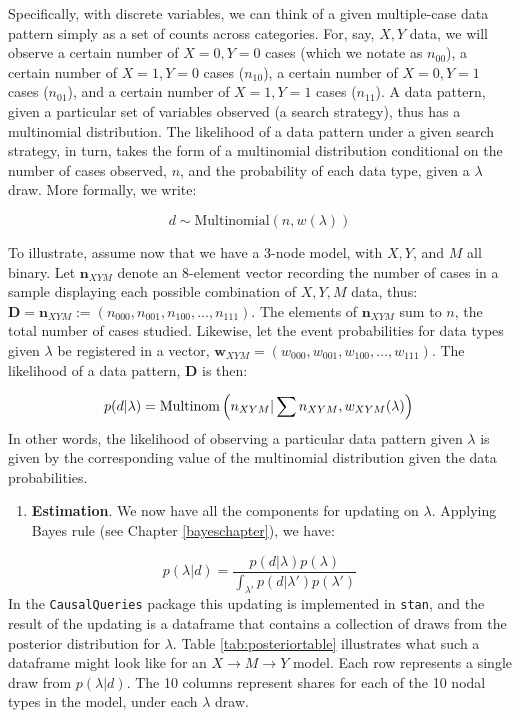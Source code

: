 \documentclass[
  12pt,
]{book}
\providecommand{\tightlist}{%
  \setlength{\itemsep}{0pt}\setlength{\parskip}{0pt}}
\begin{document}
Specifically, with discrete variables, we can think of a given multiple-case data pattern simply as a set of counts across categories. For, say, \(X, Y\) data, we will observe a certain number of \(X=0, Y=0\) cases (which we notate as \(n_{00}\)), a certain number of \(X=1, Y=0\) cases (\(n_{10}\)), a certain number of \(X=0, Y=1\) cases (\(n_{01}\)), and a certain number of \(X=1, Y=1\) cases (\(n_{11}\)). A data pattern, given a particular set of variables observed (a search strategy), thus has a multinomial distribution. The likelihood of a data pattern under a given search strategy, in turn, takes the form of a multinomial distribution conditional on the number of cases observed, \(n\), and the probability of each data type, given a \(\lambda\) draw. More formally, we write:

\[d \sim \text{Multinomial}(n, w(\lambda))\]

To illustrate, assume now that we have a 3-node model, with \(X, Y\), and \(M\) all binary. Let \(\mathbf n_{XYM}\) denote an 8-element vector recording the number of cases in a sample displaying each possible combination of \(X,Y,M\) data, thus: \(\mathbf D= \mathbf n_{XYM}:=(n_{000},n_{001},n_{100},\dots ,n_{111})\). The elements of \(\mathbf n_{XYM}\) sum to \(n\), the total number of cases studied. Likewise, let the event probabilities for data types given \(\lambda\) be registered in a vector, \(\mathbf w_{XYM}=(w_{000},w_{001},w_{100},\dots ,w_{111})\). The likelihood of a data pattern, \(\mathbf D\) is then:

\[
p(d|\lambda) = 
  \text{Multinom}\left(n_{XYM}|\sum n_{XYM}, w_{XYM}(\lambda)\right)  \\
\]
In other words, the likelihood of observing a particular data pattern given \(\lambda\) is given by the corresponding value of the multinomial distribution given the data probabilities.

\begin{enumerate}
\def\labelenumi{\arabic{enumi}.}
\setcounter{enumi}{3}
\tightlist
\item
  \textbf{Estimation}. We now have all the components for updating on \(\lambda\). Applying Bayes rule (see Chapter \ref{bayeschapter}), we have:
\end{enumerate}

\[p(\lambda | d) = \frac{p(d | \lambda)p(\lambda)}{\int_{\lambda'}{p(d | \lambda')p(\lambda')}}\]
In the \texttt{CausalQueries} package this updating is implemented in \texttt{stan}, and the result of the updating is a dataframe that contains a collection of draws from the posterior distribution for \(\lambda\). Table \ref{tab:posteriortable} illustrates what such a dataframe might look like for an \(X\rightarrow M \rightarrow Y\) model. Each row represents a single draw from \(p(\lambda|d)\). The 10 columns represent shares for each of the 10 nodal types in the model, under each \(\lambda\) draw.
\end{document}
